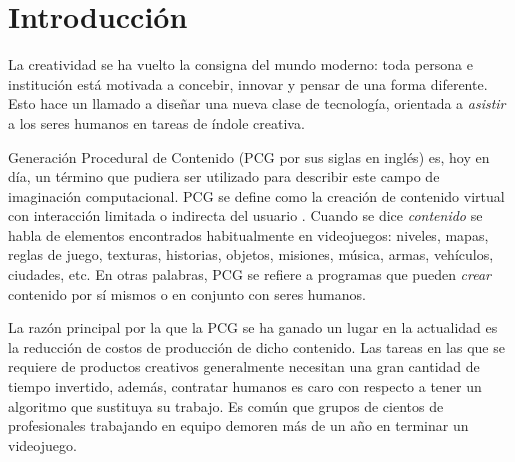 \chapter*{Introducción}\label{chapter:introduction}




La creatividad se ha vuelto la consigna del mundo moderno: toda persona e institución
está motivada a concebir, innovar y pensar de una forma diferente. 
Esto hace un llamado a diseñar una nueva clase de tecnología, orientada a
\textit{asistir} a los seres humanos en tareas de índole creativa.

Generación Procedural de Contenido (PCG por sus siglas en inglés)
es, hoy en día, un término que pudiera ser utilizado para describir este campo de imaginación
computacional. PCG se define como la creación de contenido virtual con interacción
limitada o indirecta del usuario \cite{bib:5}. Cuando se dice \textit{contenido} se habla
de elementos encontrados habitualmente en videojuegos: niveles, mapas,
reglas de juego, texturas, historias, objetos, misiones, música,
armas, vehículos, ciudades, etc. En otras palabras, PCG se refiere
a programas que pueden \textit{crear} contenido por sí mismos
o en conjunto con seres humanos. 

La razón principal por la que la PCG se ha ganado un lugar en la actualidad
es la reducción de costos de producción de dicho contenido. Las tareas en las que se
requiere de productos creativos generalmente necesitan
una gran cantidad de tiempo invertido, además,
contratar humanos es caro con respecto a tener un algoritmo
que sustituya su trabajo. Es común que grupos de cientos
de profesionales trabajando en equipo demoren más de un año en terminar un videojuego.

